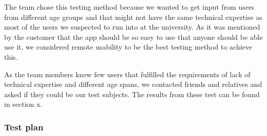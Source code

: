 The team chose this testing method because we wanted to get input from users from different age groups and that might not have the same technical expertise as most of the users we suspected to run into at the university. As it was mentioned by the customer that the app should be so easy to use that anyone should be able use it, we considered remote usability to be the best testing method to achieve this.

As the team members knew few users that fulfilled the requirements of lack of technical expertise and different age spans, we contacted friends and relatives and asked if they could be our test subjects. The results from these test can be found in section x.

\subsubsection{Test plan}
